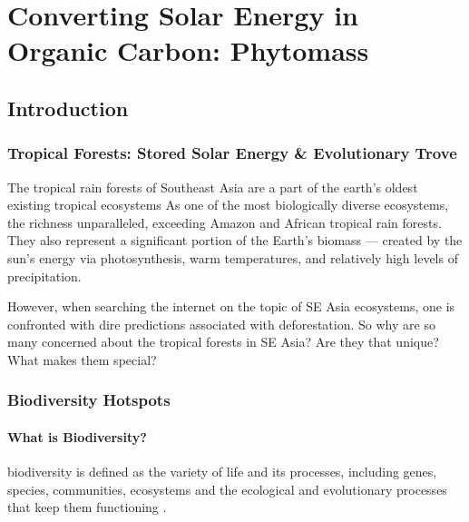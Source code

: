 \chapter{Converting Solar Energy in Organic Carbon: Phytomass}

\section{Introduction}

\subsection{Tropical Forests: Stored Solar Energy \& Evolutionary Trove}

The tropical rain forests of Southeast Asia are a part of the earth's oldest existing tropical ecosystems As one of the most biologically diverse ecosystems, the richness unparalleled, exceeding Amazon and African tropical rain forests. They also represent a significant portion of the Earth's biomass --- created by the sun's energy via photosynthesis, warm temperatures, and relatively high levels of precipitation.

However, when searching the internet on the topic of SE Asia ecosystems, one is confronted with dire predictions associated with deforestation. So why are so many concerned about the tropical forests in SE Asia? Are they that unique? What makes them special?


\subsection{Biodiversity Hotspots}

\subsubsection{What is Biodiversity?}


\Gls{biodiversity} is defined as the variety of life and its processes, including genes, species, communities, ecosystems and the ecological and evolutionary processes that keep them functioning \citep{noss1994saving}. 
 
